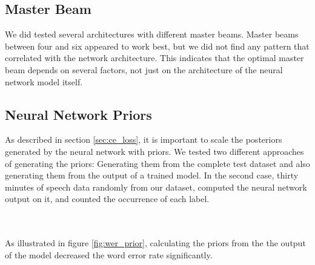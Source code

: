\subsection{Master Beam}
We did tested several architectures with different master beams. Master beams between four and six appeared to work best, but we did not find any pattern that correlated with the network architecture. This indicates that the optimal master beam depends on several factors, not just on the architecture of the neural network model itself. 
\subsection{Neural Network Priors}
As described in section \ref{sec:ce_loss}, it is important to scale the posteriors generated by the neural network with priors. We tested two different approaches of generating the priors: Generating them from the complete test dataset and also generating them from the output of a trained model. In the second case, thirty minutes of speech data randomly from our dataset, computed the neural network output on it, and counted the occurrence of each label. \\ \\
\begin{minipage}{\linewidth}
	\centering
	\label{fig:wer_priors}
\end{minipage} 
\\
As illustrated in figure \ref{fig:wer_prior}, calculating the priors from the the output of the model decreased the word error rate significantly. 
